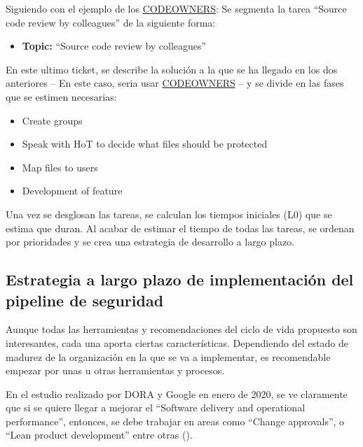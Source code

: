 \documentclass[12pt]{report} %
\begin{document}
Siguiendo con el ejemplo de los 
\href{https://docs.gitlab.com/ee/user/project/code_owners.html}{CODEOWNERS}:
Se segmenta la tarea ``Source code review by colleagues'' de la siguiente forma:

\begin{itemize}
  \item{\textbf{Topic:} ``Source code review by colleagues''}
\end{itemize}

En este ultimo ticket, se describe la solución a la que se ha llegado en los dos
anteriores -- En este caso, seria usar
\href{https://docs.gitlab.com/ee/user/project/code_owners.html}{CODEOWNERS} --
y se divide en las fases que se estimen necesarias:

\begin{itemize}
  \item{Create groups}
  \item{Speak with \gls{HoT} to decide what files should be protected}
  \item{Map files to users}
  \item{Development of feature}
\end{itemize}

Una vez se desglosan las tareas, se calculan los tiempos iniciales (L0) que se
estima que duran.
Al acabar de estimar el tiempo de todas las tareas, se ordenan por prioridades y
se crea una estrategia de desarrollo a largo plazo.

\subsection{Estrategia a largo plazo de implementación del pipeline de
seguridad}

Aunque todas las herramientas y recomendaciones del ciclo de vida propuesto son
interesantes, cada una aporta ciertas características.
Dependiendo del estado de madurez de la organización en la que se va a implementar, 
es recomendable empezar por unas u otras herramientas y procesos.

En el estudio realizado por DORA y Google en enero de 2020, se ve claramente que
si se quiere llegar a mejorar el ``Software delivery and operational
performance'', entonces, se debe trabajar en areas como ``Change approvals'', o
``Lean product development'' entre otras (\cite{DORA2020}).
\end{document}
